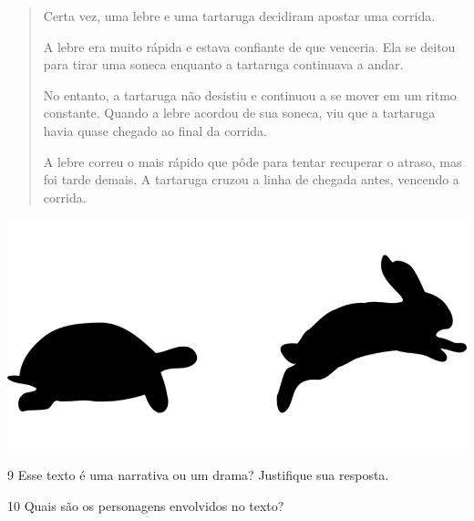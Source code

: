 \begin{minipage}{.5\textwidth}
\begin{quote}
Certa vez, uma lebre e uma tartaruga decidiram apostar uma corrida.

A lebre era muito rápida e estava confiante de que venceria. Ela se
deitou para tirar uma soneca enquanto a tartaruga continuava a andar.

No entanto, a tartaruga não desistiu e continuou a se mover em um ritmo
constante. Quando a lebre acordou de sua soneca, viu que a tartaruga
havia quase chegado ao final da corrida.

A lebre correu o mais rápido que pôde para tentar recuperar o atraso,
mas foi tarde demais. A tartaruga cruzou a linha de chegada antes,
vencendo a corrida.

\end{quote}

\end{minipage}
\begin{minipage}{.5\textwidth}
\includegraphics[width=\textwidth]{./imgs/img6.png}
\end{minipage}

\bigskip\bigskip\bigskip
\num{9} Esse texto é uma narrativa ou um drama? Justifique sua resposta.


\num{10} Quais são os personagens envolvidos no texto?


\pagebreak


